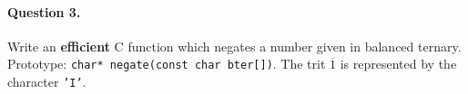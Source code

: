 \paragraph{Question 3.} Write an \textbf{efficient} \textsf{C} function which
negates a number given in balanced ternary. Prototype:
\verb|char* negate(const char bter[])|. The trit \(\overline{1}\) is
represented by the character \texttt{'I'}.

